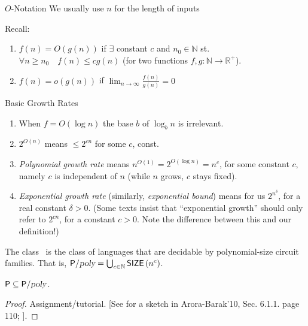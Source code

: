 \begin{trailer}{$O$-Notation}
    We usually use $n$ for the length of inputs


Recall:
\begin{enumerate}
    \item 
 $f(n)=O(g(n))$ if $\exists$ constant $c$ and $n_0 \in \mathbb{N}$ st. $\forall n \geqslant n_0 \quad f(n) \leqslant c g(n) $ (for two functions  $f, g: \mathbb{N} \rightarrow \mathbb{R}^{+}$).

\item $f(n)=o(g(n))$ if $\lim _{n \rightarrow \infty} \frac{f(n)}{g(n)}=0$
\end{enumerate}
\end{trailer}

\begin{trailer}{Basic Growth Rates}
\begin{enumerate}
    \item When $f=O\left(\log n\right)$ the base $b$ of $\log _b n$ is irrelevant.
    
    \item $2^{O(n)}$ means $\leqslant 2^{c n}$ for some $c$, const.

    \item \emph{Polynomial growth rate} means $n^{O(1)}=2^{O\left(\log n\right)}=n^c$, for some constant $c$, namely $c$ is independent of $n$ (while $n$ grows, $c$ stays fixed).
    \item \emph{Exponential growth rate} (similarly, \emph{exponential bound})  means for us $2^{n^\delta}$, for a real constant $\delta>0$. (Some texts insist that ``exponential growth'' should only refer to $2^{cn}$, for a constant $c>0$. Note the difference between this and our definition!)
\end{enumerate}
\end{trailer}






\begin{definition} The class \Ppoly~is the class of languages that are decidable by polynomial-size circuit families.
That is, ${\mathsf{P}}/{\textsl{poly}}=\bigcup_{c \in \mathbb{N}} \operatorname{{\mathsf{SIZE}}}\left(n^c\right)$.
\end{definition}


\begin{theorem}
${\mathsf{P}} \subseteq {\ensuremath{\mathsf{P}}}/{\textsl{poly}}$.
\end{theorem}

\begin{proof}
Assignment/tutorial.
[See for a sketch in Arora-Barak'10, Sec. 6.1.1. page 110; \cite{AB09}]. 
\end{proof}

